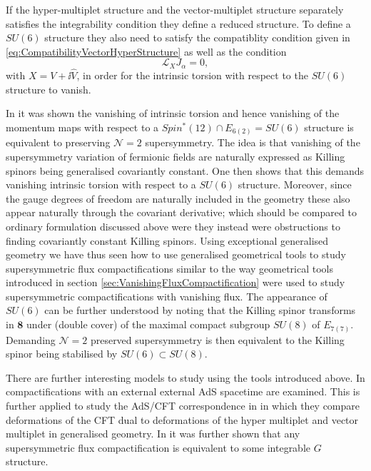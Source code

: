 If the hyper-multiplet structure and the vector-multiplet structure separately satisfies the integrability condition they define a reduced structure. To define a $SU(6)$ structure they also need to satisfy the compatiblity condition given in \eqref{eq:CompatibilityVectorHyperStructure} as well as the condition 
\begin{equation}
\mathscr{L}_XJ_\alpha = 0,
\end{equation}
with $X=V+\ii \hat{V}$, in order for the intrinsic torsion with respect to the $SU(6)$ structure to vanish. \cite{Ashmore:2015joa}

In \cite{Coimbra:2014uxa,Ashmore:2015joa} it was shown the vanishing of intrinsic torsion and hence vanishing of the momentum maps with respect to a $Spin^*(12)\cap E_{6(2)}=SU(6)$ structure is equivalent to preserving $\mathcal{N}=2$ supersymmetry. The idea is that vanishing of the supersymmetry variation of fermionic fields are naturally expressed as Killing spinors being generalised covariantly constant. One then shows that this demands vanishing intrinsic torsion with respect to a $SU(6)$ structure. Moreover, since the gauge degrees of freedom are naturally included in the geometry these also appear naturally through the covariant derivative; which should be compared to ordinary formulation discussed above were they instead were obstructions to finding covariantly constant Killing spinors. Using exceptional generalised geometry we have thus seen how to use generalised geometrical tools to study supersymmetric flux compactifications similar to the way geometrical tools introduced in section \ref{sec:VanishingFluxCompactification} were used to study supersymmetric compactifications with vanishing flux. The appearance of $SU(6)$ can be further understood by noting that the Killing spinor transforms in $\mathbf{8}$ under (double cover) of the maximal compact subgroup $SU(8)$ of $E_{7(7)}$. Demanding $\mathcal{N}=2$ preserved supersymmetry is then equivalent to the Killing spinor being stabilised by $SU(6)\subset SU(8)$. 


There are further interesting models to study using the tools introduced above. In \cite{Grana:2016dyl,Ashmore:2016qvs} compactifications with an external external AdS spacetime are examined. This is further applied to study the AdS/CFT correspondence in \cite{Ashmore:2016oug} in which they compare deformations of the CFT dual to deformations of the hyper multiplet and vector multiplet in generalised geometry. In \cite{Coimbra:2016ydd} it was further shown that any supersymmetric flux compactification is equivalent to some integrable $G$ structure. 

